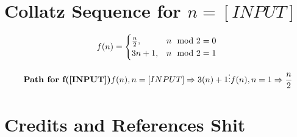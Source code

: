 \documentclass{article}
\begin{document}
\section{Collatz Sequence for \(n=[INPUT]\) }

\[
    f(n)=
    \begin{cases}
    \frac{n}{2}, & n \mod 2=0
    \\
    3n+1, &n \mod 2=1
    \end{cases} \\
\]

\[
    \textbf{Path for f([INPUT])}
    \\[3mm]
   
    f(n), n=[INPUT]
    \\
    \Rightarrow 3(n)+1
    \\[1mm]
    \vdots
    \\[1mm]
    f(n), n=1
    \\
    \Rightarrow \frac{n}{2}
\]

    
\section{Credits and References Shit}
\end{document}
